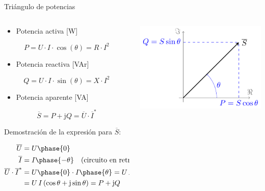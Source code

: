 \documentclass[aspectratio=169, usenames,svgnames,dvipsnames]{beamer}
\begin{document}
\begin{frame}{Triángulo de potencias}
    \begin{columns} 
    \begin{column}{0.6\columnwidth}
    \vspace{2mm}
    \begin{itemize}
        \item Potencia \alert{activa} [W]
    \end{itemize}
    \[  
        \boxed{P = U\cdot I\cdot\cos(\theta) = R \cdot I^2}
    \]
    
    \begin{itemize}
        \item Potencia \alert{reactiva} [VAr]
    \end{itemize}
    \[
        \boxed{Q = U\cdot I\cdot\sin(\theta) = X \cdot I^2}
    \]
    
    \begin{itemize}
        \item Potencia \alert{aparente} [VA]
    \end{itemize}
    \[
        \boxed{\overline{S} = P + \mathrm{j}Q = \overline{U} \cdot \overline{I}^*}
    \]
    
    \hspace{8mm}Demostración de la expresión para $\overline{S}$:

    \vspace{-7mm}
    {\begin{align*}
        \overline{U} &= U\phase{0}\\
        \overline{I} &= I\phase{-\theta} \quad \text{(circuito en retraso)}\\
        \overline{U}\cdot\overline{I}^* &= U\phase{0} \cdot I\phase{\theta} = U\,I\phase{\theta}=\\
        &=U\,I\, (\cos\theta + \mathrm{j} \sin\theta) = P + \mathrm{j} Q
    \end{align*}}
    \end{column}
    
    \begin{column}{0.4\columnwidth}
    \vspace{-3mm}
    
        \hspace{-15mm}
        \includegraphics[width=1.2\linewidth]{../figs/trianguloPotencias.pdf}    
    

\end{column}
\end{columns}
\end{frame}
\end{document}
